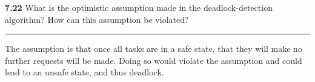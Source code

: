 \documentclass[12pt]{jhwhw}
\begin{document}
\clearpage
\textbf{7.22}  
	What is the optimistic assumption made in the deadlock-detection algorithm?
	How can this assumption be violated?
\textcolor[RGB]{240,240,240}{\rule{\textwidth}{0.5pt}}\bigbreak

	\begin{addmargin}[1em]{}
		The assumption is that once all tasks are in a safe state, that they will make no
		further requests will be made. Doing so would violate the assumption and could lead 
		to an unsafe state, and thus deadlock.
	\end{addmargin}
\end{document}
